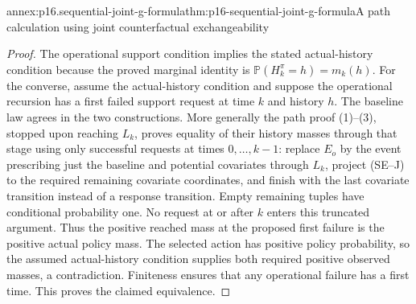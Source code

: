 \begin{annexitem}{annex:p16.sequential-joint-g-formula}{thm:p16-sequential-joint-g-formula}{A path calculation using joint counterfactual exchangeability}
\begin{proof}
The operational support condition implies the stated actual-history
condition because the proved marginal identity is
\(\mathbb P(H_k^\pi=h)=m_k(h)\). For the converse, assume the
actual-history condition and suppose the operational recursion has a
first failed support request at time \(k\) and history \(h\).
The baseline law agrees in the two constructions. More generally the
path proof (1)--(3), stopped upon reaching \(L_k\), proves equality
of their history masses through that stage using only successful requests
at times \(0,\ldots,k-1\): replace \(E_o\) by the event prescribing
just the baseline and potential covariates through \(L_k\), project
(SE--J) to the required remaining covariate coordinates, and finish with
the last covariate transition instead of a response transition. Empty
remaining tuples have conditional probability one. No request at or
after \(k\) enters this truncated argument. Thus the positive reached
mass at the proposed first failure is the positive actual policy mass.
The selected action has positive policy probability, so the assumed
actual-history condition supplies both required positive observed masses,
a contradiction. Finiteness ensures that any operational failure has
a first time. This proves the claimed equivalence.
\end{proof}
\end{annexitem}

